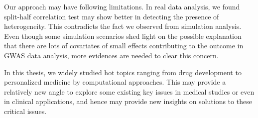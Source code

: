   Our approach may have following limitations. In real data analysis, we found split-half correlation test may show better in detecting the presence of heterogeneity. This contradicts the fact we observed from simulation analysis. Even though some simulation scenarios shed light on the possible explanation that there are lots of covariates of small effects contributing to the outcome in GWAS data analysis, more evidences are needed to clear this concern. 

  In this thesis, we widely studied hot topics ranging from drug development to personalized medicine by computational approaches. This may provide a relatively new angle to explore some existing key issues in medical studies or even in clinical applications, and hence may provide new insights on solutions to these critical issues.
\chapterend
